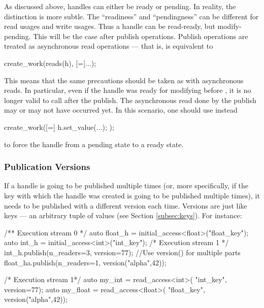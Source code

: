 As discussed above, handles can either be ready or pending. 
In reality, the distinction is more subtle. 
The ``readiness'' and ``pendingness'' can be different for read usages and write usages.
Thus a handle can be read-ready, but modify-pending.
This will be the case after publish operations.
Publish operations are treated as asynchronous read operations --- that is,
 is equivalent to
\begin{CppCode}
create_work(reads(h), [=]{...});  
\end{CppCode}
This means that the same precautions should be taken as with asynchronous reads. 
In particular, even if the handle was ready for modifying before
, it is no longer valid to call  after the publish.
The asynchronous read done by the publish may or may not have occurred yet.  
In this scenario, one should use instead
\begin{CppCode}
create_work([=]{ h.set_value(...); });
\end{CppCode}
to force the handle from a pending state to a ready state.

\subsubsection{Publication Versions}
If a handle is going to be published multiple times (or, more specifically, if
the key with which the handle was created is going to be published multiple
times), it needs to be published with a different version each time.  
Versions are just like keys --- an arbitrary tuple of values (see Section \ref{subsec:keys}).  
For instance:

\begin{minipage}{0.5\textwidth}
\begin{CppCode}
/** Execution stream 0 */
auto float_h =
  initial_access<float>("float_key");
auto int_h =
  initial_access<int>("int_key");
/* Execution stream 1 */
int_h.publish(n_readers=3, version=77);
//Use version() for multiple parts
float_ha.publish(n_readers=1, 
    version("alpha",42));
\end{CppCode}
\end{minipage}
\begin{minipage}{0.45\textwidth}
\begin{CppCode}
/* Execution stream 1*/
auto my_int =  read_access<int>(
  "int_key", version=77);
auto my_float = read_access<float>(
  "float_key", version("alpha",42));
\end{CppCode}
\end{minipage}

